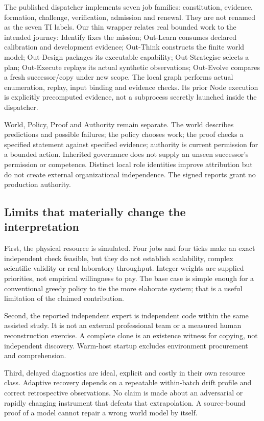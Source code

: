 The published dispatcher implements seven job families: constitution, evidence, formation, challenge, verification, admission and renewal. They are not renamed as the seven TI labels. Our thin wrapper relates real bounded work to the intended journey: Identify fixes the mission; Out-Learn consumes declared calibration and development evidence; Out-Think constructs the finite world model; Out-Design packages its executable capability; Out-Strategise selects a plan; Out-Execute replays its actual synthetic observations; Out-Evolve compares a fresh successor/copy under new scope. The local graph performs actual enumeration, replay, input binding and evidence checks. Its prior Node execution is explicitly precomputed evidence, not a subprocess secretly launched inside the dispatcher.

\LifecycleResults

World, Policy, Proof and Authority remain separate. The world describes predictions and possible failures; the policy chooses work; the proof checks a specified statement against specified evidence; authority is current permission for a bounded action. Inherited governance does not supply an unseen successor's permission or competence. Distinct local role identities improve attribution but do not create external organizational independence. The signed reports grant no production authority.

\subsection{Limits that materially change the interpretation}
First, the physical resource is simulated. Four jobs and four ticks make an exact independent check feasible, but they do not establish scalability, complex scientific validity or real laboratory throughput. Integer weights are supplied priorities, not empirical willingness to pay. The base case is simple enough for a conventional greedy policy to tie the more elaborate system; that is a useful limitation of the claimed contribution.

Second, the reported independent expert is independent code within the same assisted study. It is not an external professional team or a measured human reconstruction exercise. A complete clone is an existence witness for copying, not independent discovery. Warm-host startup excludes environment procurement and comprehension.

Third, delayed diagnostics are ideal, explicit and costly in their own resource class. Adaptive recovery depends on a repeatable within-batch drift profile and correct retrospective observations. No claim is made about an adversarial or rapidly changing instrument that defeats that extrapolation. A source-bound proof of a model cannot repair a wrong world model by itself.

